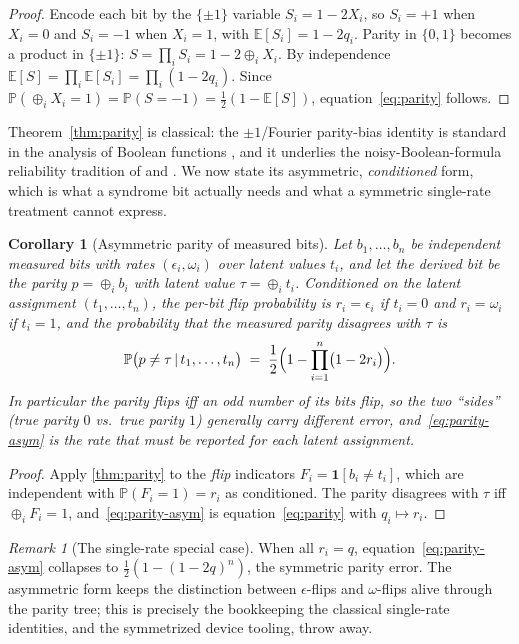 \documentclass[12pt]{article}
\numberwithin{equation}{section}
\theoremstyle{plain}
\newtheorem{corollary}[theorem]{Corollary}
\theoremstyle{definition}
\theoremstyle{remark}
\newtheorem{remark}[theorem]{Remark}
\newcommand{\eps}{\epsilon}
\newcommand{\Prob}{\mathbb{P}}
\newcommand{\Ind}[1]{\mathbf{1}\!\left[#1\right]}
\newcommand{\given}{\,\vert\,}
\newcommand{\bits}{\{0,1\}}
\newcommand{\bxor}{\oplus}
\begin{document}
\begin{proof}
Encode each bit by the $\{\pm1\}$ variable $S_i=1-2X_i$, so $S_i=+1$ when
$X_i=0$ and $S_i=-1$ when $X_i=1$, with $\mathbb{E}[S_i]=1-2q_i$. Parity in
$\bits$ becomes a product in $\{\pm1\}$: $S=\prod_i S_i = 1-2\bxor_i X_i$. By
independence $\mathbb{E}[S]=\prod_i\mathbb{E}[S_i]=\prod_i(1-2q_i)$. Since
$\Prob(\bxor_i X_i=1)=\Prob(S=-1)=\tfrac12(1-\mathbb{E}[S])$,
equation~\eqref{eq:parity} follows.
\end{proof}

Theorem~\ref{thm:parity} is classical: the $\pm1$/Fourier parity-bias identity is
standard in the analysis of Boolean functions \citep{odonnell2014}, and it
underlies the noisy-Boolean-formula reliability tradition of \citet{vonneumann1956}
and \citet{pippenger1988}. We now state its asymmetric,
\emph{conditioned} form, which is what a syndrome bit actually needs and what a
symmetric single-rate treatment cannot express.

\begin{corollary}[Asymmetric parity of measured bits]
\label{cor:parity-asym}
Let $b_1,\dots,b_n$ be independent measured bits with rates $(\eps_i,\omega_i)$
over latent values $t_i$, and let the derived bit be the parity
$p=\bxor_i b_i$ with latent value $\tau=\bxor_i t_i$. Conditioned on the latent
assignment $(t_1,\dots,t_n)$, the per-bit flip probability is $r_i=\eps_i$ if
$t_i=0$ and $r_i=\omega_i$ if $t_i=1$, and the probability that the measured
parity disagrees with $\tau$ is
\begin{equation}
\label{eq:parity-asym}
  \Prob\bigl(p \neq \tau \given t_1,\dots,t_n\bigr)
  \;=\; \frac12\Bigl(1 - \prod_{i=1}^{n}\bigl(1-2r_i\bigr)\Bigr).
\end{equation}
In particular the parity flips iff an \emph{odd} number of its bits flip, so the
two ``sides'' (true parity $0$ vs.\ true parity $1$) generally carry different
error, and~\eqref{eq:parity-asym} is the rate that must be reported for each
latent assignment.
\end{corollary}

\begin{proof}
Apply \cref{thm:parity} to the \emph{flip} indicators $F_i=\Ind{b_i\neq t_i}$,
which are independent with $\Prob(F_i=1)=r_i$ as conditioned. The parity disagrees
with $\tau$ iff $\bxor_i F_i=1$, and~\eqref{eq:parity-asym} is
equation~\eqref{eq:parity} with $q_i\mapsto r_i$.
\end{proof}

\begin{remark}[The single-rate special case]
When all $r_i=q$, equation~\eqref{eq:parity-asym} collapses to
$\tfrac12(1-(1-2q)^n)$, the symmetric parity error. The asymmetric form keeps the
distinction between $\eps$-flips and $\omega$-flips alive through the parity tree;
this is precisely the bookkeeping the classical single-rate identities, and the
symmetrized device tooling, throw away.
\end{remark}
\end{document}
